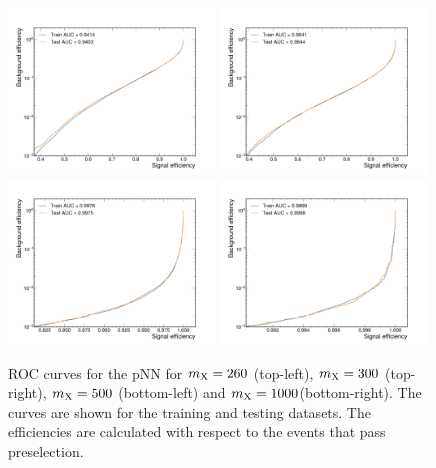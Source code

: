 \begin{figure}
    \centering
    \includegraphics[width=0.49\textwidth]{Figures/Dihiggs/categorisation/ROC/Graviton/GluGluToBulkGravitonToHHTo2G2Tau_M-260/ROC_new.pdf}
    \includegraphics[width=0.49\textwidth]{Figures/Dihiggs/categorisation/ROC/Graviton/GluGluToBulkGravitonToHHTo2G2Tau_M-300/ROC_new.pdf} \\
    \includegraphics[width=0.49\textwidth]{Figures/Dihiggs/categorisation/ROC/Graviton/GluGluToBulkGravitonToHHTo2G2Tau_M-500/ROC_new.pdf}
    \includegraphics[width=0.49\textwidth]{Figures/Dihiggs/categorisation/ROC/Graviton/GluGluToBulkGravitonToHHTo2G2Tau_M-1000/ROC_new.pdf}
    \caption[ROC Curves for the \XTwoHH pNN]{ROC curves for the \XTwoHH pNN for $m_{\mathrm{X}}=260$ (top-left), $m_{\mathrm{X}}=300$ (top-right), $m_{\mathrm{X}}=500$ (bottom-left) and $m_{\mathrm{X}}=1000$\GeV (bottom-right). The curves are shown for the training and testing datasets. The efficiencies are calculated with respect to the events that pass preselection.}\label{fig:graviton_roc}
\end{figure}

